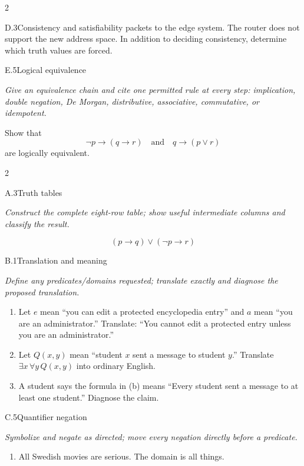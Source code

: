\documentclass[9pt]{extarticle}
\begin{document}
\begin{multicols}{2}
\begin{CoreProblem}{D.3}{Consistency and satisfiability}
packets to the edge system. The router does not support the new address space.
In addition to deciding consistency, determine which truth values are forced.
\end{CoreProblem}
\begin{CoreProblem}{E.5}{Logical equivalence}
{\scriptsize\textit{Give an equivalence chain and cite one permitted rule at every step: implication, double negation, De Morgan, distributive, associative, commutative, or idempotent.}\par}
Show that
\[
  \neg p\to(q\to r)
  \quad\text{and}\quad
  q\to(p\lor r)
\]
are logically equivalent.
\end{CoreProblem}
\end{multicols}
\CoreWorkArea
\FormBreak
{}
\begin{multicols}{2}
\begin{CoreProblem}{A.3}{Truth tables}
{\scriptsize\textit{Construct the complete eight-row table; show useful intermediate columns and classify the result.}\par}
\[
  (p\to q)\lor(\neg p\to r)
\]
\end{CoreProblem}
\begin{CoreProblem}{B.1}{Translation and meaning}
{\scriptsize\textit{Define any predicates/domains requested; translate exactly and diagnose the proposed translation.}\par}
\begin{enumerate}[label=(\alph*)]
  \item Let $e$ mean ``you can edit a protected encyclopedia entry'' and $a$
        mean ``you are an administrator.'' Translate: ``You cannot edit a
        protected entry unless you are an administrator.''
  \item Let $Q(x,y)$ mean ``student $x$ sent a message to student $y$.''
        Translate $\exists x\,\forall y\,Q(x,y)$ into ordinary English.
  \item A student says the formula in (b) means ``Every student sent a message
        to at least one student.'' Diagnose the claim.
\end{enumerate}
\end{CoreProblem}
\begin{CoreProblem}{C.5}{Quantifier negation}
{\scriptsize\textit{Symbolize and negate as directed; move every negation directly before a predicate.}\par}
\begin{enumerate}[label=(\alph*)]
  \item All Swedish movies are serious. The domain is all things.

\end{enumerate}
\end{CoreProblem}
\end{multicols}
\end{document}
